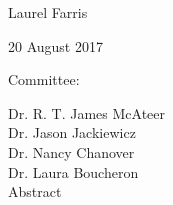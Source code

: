 \documentclass[modern]{aastex62}
\begin{document}
\begin{titlepage}\centering



    {\scshape\LARGE\par}
    \vfill
    {\Large Laurel Farris\par}
    \vfill
    {\large 20 August 2017\par}
    \vfill
    {\large Committee:}

    Dr. R. T. James McAteer\\
    Dr. Jason Jackiewicz\\
    Dr. Nancy Chanover\\
    Dr. Laura Boucheron\\
    \vfill
    {\large Abstract}
    \justify

    

    \centering
\end{titlepage}

\newpage
\setlength{\parskip}{0.5ex}
\tableofcontents



\newpage
\setlength{\parskip}{2.00ex}

\setlength{\marginparwidth}{1.50in}
\setlength{\marginparsep}{0.30in}


%








%


%
%



\clearpage
%
%
%


\end{document}
